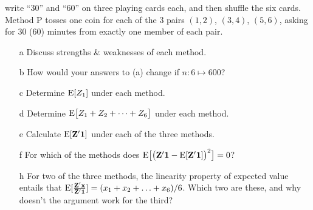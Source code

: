 \documentclass{article}
\begin{document}
\begin{enumerate}
write ``30'' and ``60'' on three playing cards each, and then shuffle
the six cards. Method P tosses one coin for each of the 3 pairs
$(1,2)$, $(3,4)$, $(5,6)$, asking for 30 (60) minutes from exactly one
member of each pair. 
  \begin{minipage}{.45\linewidth}
\begin{itemize}
\item[a] Discuss strengths \& weaknesses of each method.
\item[b] How would your answers to (a) change if $n: 6 \mapsto 600$?
\item[c] Determine $\mathrm{E}[  Z_{1} ]$  under each method.
\item[d] Determine $\mathrm{E}\big[  Z_{1} + Z_{2} + \cdots + Z_{6} \big]$ under each method.
\item[e] Calculate $\mathrm{E}[\mathbf{Z}'\mathbf{1}]$ under each of the three methods.
\end{itemize}
\end{minipage}
% 
\begin{minipage}{.45\linewidth}
  \begin{itemize}
 \item[f] For which of the methods does $\mathrm{E}
  \big[\big(\mathbf{Z}'\mathbf{1} -\mathrm{E} [\mathbf{Z}'\mathbf{1}]\big)^{2}\big] =
  0$?\footnotemark[1] 
\item[h] For two of the three methods, the linearity property of expected value%
  \footnotemark[2]
  entails that
  $\mathrm{E} [\frac{\mathbf{Z}'\mathbf{x}}{\mathbf{Z}'\mathbf{1}}] = (x_{1}
  + x_{2}+ \ldots + x_{6})/6$.  Which two are
  these, and why doesn't the argument work for the third?
\end{itemize}
\end{minipage}
\end{enumerate}
\end{document}
